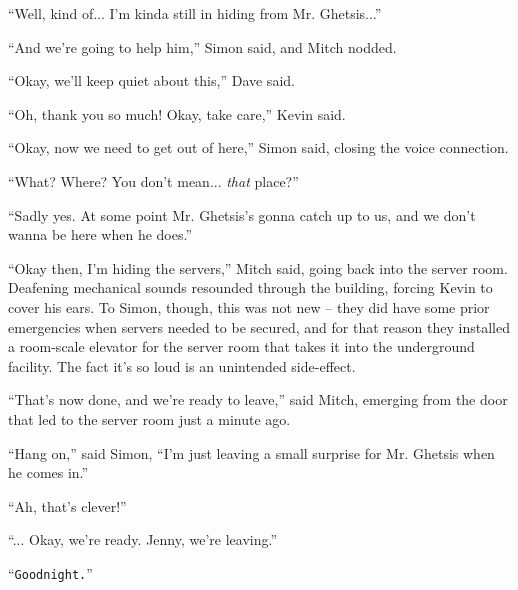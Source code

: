 \documentclass[10pt,a4paper]{article}
\newcommand{\lang}[2]{ #2 \par}
\newcommand{\ai}[2]{
	\lang{
		-- \texttt{#1}
	}{
		``\texttt{#2}''
	}
}
\newcommand{\ainame}{Jenny}
\newcommand{\mainname}{Simon}
\newcommand{\auxname}{Mitch}
\newcommand{\policename}{Mr. Ghetsis}
\newcommand{\criminalname}{Kevin}
\newcommand{\friendAname}{Dave}
\begin{document}
\lang{...}{``Well, kind of... I'm kinda still in hiding from \policename{}...''}
\lang{...}{``And we're going to help him,'' \mainname{} said, and \auxname{} nodded.}
\lang{...}{``Okay, we'll keep quiet about this,'' \friendAname{} said.}
\lang{...}{``Oh, thank you so much! Okay, take care,'' \criminalname{} said.}
\lang{...}{``Okay, now we need to get out of here,'' \mainname{} said, closing the voice connection.}
\lang{...}{``What? Where? You don't mean... \emph{that} place?''}
\lang{...}{``Sadly yes. At some point \policename{}'s gonna catch up to us, and we don't wanna be here when he does.''}
\lang{...}{``Okay then, I'm hiding the servers,'' \auxname{} said, going back into the server room. Deafening mechanical sounds resounded through the building, forcing \criminalname{} to cover his ears. To \mainname{}, though, this was not new -- they did have some prior emergencies when servers needed to be secured, and for that reason they installed a room-scale elevator for the server room that takes it into the underground facility. The fact it's so loud is an unintended side-effect.}
\lang{...}{``That's now done, and we're ready to leave,'' said \auxname{}, emerging from the door that led to the server room just a minute ago.}
\lang{...}{``Hang on,'' said \mainname{}, ``I'm just leaving a small surprise for \policename{} when he comes in.''}
\lang{...}{``Ah, that's clever!''}
\lang{...}{``... Okay, we're ready. \ainame{}, we're leaving.''}
\ai{...}{Goodnight.}

\noindent\makebox[\linewidth]{\rule{\paperwidth}{0.4pt}}
\end{document}
